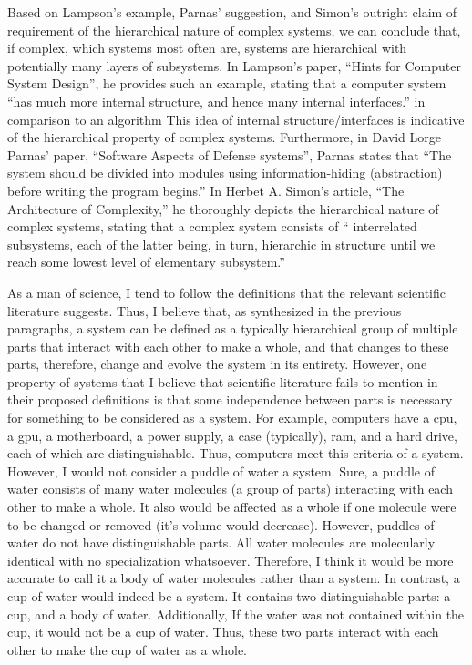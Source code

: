 \documentclass[11pt]{article}
\begin{document}
\par Based on Lampson's example, Parnas' suggestion, and Simon's outright claim of requirement of the hierarchical nature of complex systems, we can conclude that, if complex, which systems most often are, systems are hierarchical with potentially many layers of subsystems. In Lampson's paper, ``Hints for Computer System Design'', he provides such an example, stating that a computer system ``has much more internal structure, and hence many internal interfaces.'' in comparison to an algorithm\cite{lampson:1983} This idea of internal structure/interfaces is indicative of the hierarchical property of complex systems. Furthermore, in David Lorge Parnas' paper, ``Software Aspects of Defense systems'', Parnas states that ``The system should be divided into modules using information-hiding (abstraction) before writing the program begins.''\cite{parnas:1985} In Herbet A. Simon's article, ``The Architecture of Complexity,'' he thoroughly depicts the hierarchical nature of complex systems, stating that a complex system consists of `` interrelated subsystems, each of the latter being, in turn, hierarchic in structure until we reach some lowest level of elementary subsystem.'' \cite{simon:1962}
\par As a man of science, I tend to follow the definitions that the relevant scientific literature suggests. Thus, I believe that, as synthesized in the previous paragraphs, a system can be defined as a typically hierarchical group of multiple parts that interact with each other to make a whole, and that changes to these parts, therefore, change and evolve the system in its entirety. However, one property of systems that I believe that scientific literature fails to mention in their proposed definitions is that some independence between parts is necessary for something to be considered as a system. For example, computers have a cpu, a gpu, a motherboard, a power supply, a case (typically), ram, and a hard drive, each of which are distinguishable. Thus, computers meet this criteria of a system. However, I would not consider a puddle of water a system. Sure, a puddle of water consists of many water molecules (a group of parts) interacting with each other to make a whole. It also would be affected as a whole if one molecule were to be changed or removed (it's volume would decrease). However, puddles of water do not have distinguishable parts. All water molecules are molecularly identical with no specialization whatsoever. Therefore, I think it would be more accurate to call it a body of water molecules rather than a system. In contrast, a cup of water would indeed be a system. It contains two distinguishable parts: a cup, and a body of water. Additionally, If the water was not contained within the cup, it would not be a cup of water. Thus, these two parts interact with each other to make the cup of water as a whole.
\end{document}
